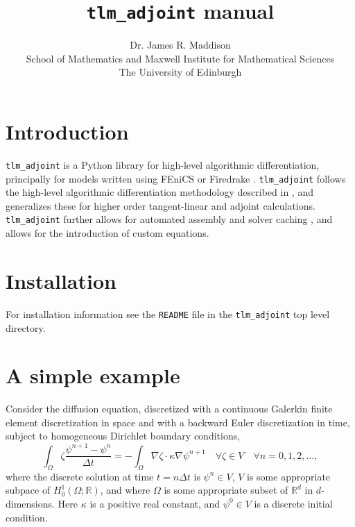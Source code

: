 \documentclass[11pt]{article}
\title{\texttt{tlm\_adjoint} manual}
\author{Dr. James R. Maddison \\
  School of Mathematics and Maxwell Institute for Mathematical Sciences \\
  The University of Edinburgh}
\begin{document}
\maketitle

\tableofcontents

\section{Introduction}

\texttt{tlm\_adjoint} \citep{maddison2019} is a Python library for high-level
algorithmic differentiation, principally for models written using FEniCS
\citep{logg2012,alnaes2015} or Firedrake \citep{rathgeber2016}.
\texttt{tlm\_adjoint} follows the high-level algorithmic differentiation
methodology described in \citet{farrell2013}, and generalizes these for higher
order tangent-linear and adjoint calculations. \texttt{tlm\_adjoint} further
allows for automated assembly and solver caching \citep[see][]{maddison2014},
and allows for the introduction of custom equations.

\section{Installation}

For installation information see the \texttt{README} file in the
\texttt{tlm\_adjoint} top level directory.

\section{A simple example}\label{sect:diffusion}

Consider the diffusion equation, discretized with a continuous Galerkin finite
element discretization in space and with a backward Euler discretization in
time, subject to homogeneous Dirichlet boundary conditions,
\begin{equation*}
  \int_\Omega \zeta \frac{\psi^{n + 1} - \psi^n}{\Delta t}
    = -\int_\Omega \nabla \zeta \cdot \kappa \nabla \psi^{n + 1}
    \quad \forall \zeta \in V \quad \forall n = 0, 1, 2, \ldots,
\end{equation*}
where the discrete solution at time $t = n \Delta t$ is $\psi^n \in V$, $V$ is
some appropriate subpace of $H^1_0 \left( \Omega; \mathbb{R} \right)$, and
where $\Omega$ is some appropriate subset of $\mathbb{R}^d$ in $d$-dimensions.
Here $\kappa$ is a positive real constant, and $\psi^0 \in V$ is a discrete
initial condition.
\end{document}
